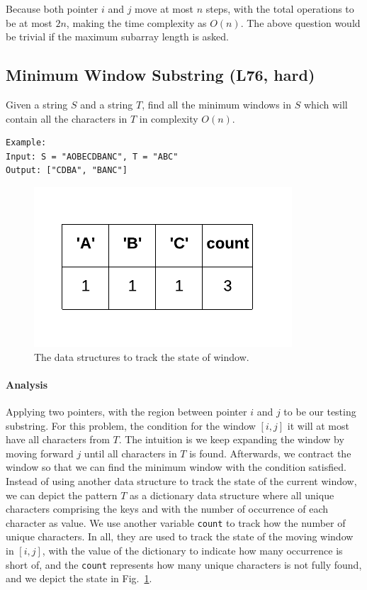 \documentclass[../main.tex]{subfiles}
\begin{document}
Because both pointer $i$ and $j$  move at most $n$ steps, with the total operations to be at most $2n$, making the time complexity as $O(n)$. The above question would be trivial if the maximum subarray length is asked.

\subsection{Minimum Window Substring (L76, hard)} 
 Given a string $S$ and a string $T$, find all the minimum windows in $S$ which will contain all the characters in $T$ in complexity $O(n)$.
\begin{lstlisting}[numbers=none]
Example:
Input: S = "AOBECDBANC", T = "ABC"
Output: ["CDBA", "BANC"]
\end{lstlisting}
\begin{figure}[h!]
    \centering
    \includegraphics[width=0.5\columnwidth]{fig/minimum_window_substring.png}
    \caption{The data structures to track the state of window.}
    \label{fig:minimum_window}
\end{figure}
\paragraph{Analysis} Applying two pointers, with the region between pointer $i$ and $j$ to be our testing substring. For this problem, the condition for the window $[i, j]$ it will at most have all characters from $T$. The intuition is we keep expanding the window by moving forward $j$ until all characters in $T$ is found. Afterwards, we contract the window so that we can find the minimum window with the condition satisfied. Instead of using another data structure to track the state of the current window, we can depict the pattern $T$ as a dictionary data structure where all unique characters comprising the keys and with the number of occurrence of each character as value. We use another variable \texttt{count} to track how the number of unique characters. In all, they are used to track the state of the moving window in $[i, j]$, with the value of the dictionary to indicate how many occurrence is short of, and the \texttt{count} represents how many unique characters is not fully found, and we depict the state  in Fig.~\ref{fig:minimum_window}. 
\end{document}
